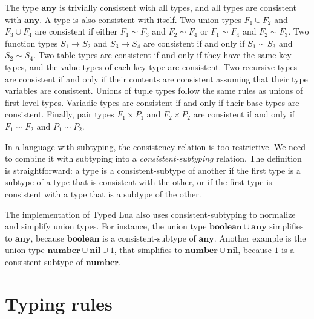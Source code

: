 \documentclass[10pt]{sigplanconf}
\newcommand{\Any}{\mathbf{any}}
\newcommand{\Nil}{\mathbf{nil}}
\newcommand{\Boolean}{\mathbf{boolean}}
\newcommand{\Number}{\mathbf{number}}
\begin{document}
The type $\Any$ is trivially consistent with all types, and all types
are consistent with $\Any$. A type is also consistent with
itself. Two union types $F_1 \cup F_2$ and $F_3 \cup F_4$ are
consistent if either $F_1 \sim F_3$ and $F_2 \sim F_4$ or
$F_1 \sim F_4$ and $F_2 \sim F_3$. Two function types
$S_1 \rightarrow S_2$ and $S_3 \rightarrow S_4$ are consistent
if and only if $S_1 \sim S_3$ and $S_2 \sim S_4$. Two table types are consistent if and only if they have the same key types, and the value types of each key type are consistent. Two recursive types are consistent if and only if their contents are consistent assuming that their type variables are consistent. Unions of tuple types follow the same rules as unions of first-level types. Variadic types are consistent if and only if their base types are consistent. 
Finally, pair types $F_1 \times P_1$ and $F_2 \times P_2$ are
consistent if and only if $F_1 \sim F_2$ and $P_1 \sim P_2$.

In a language with subtyping, the consistency relation is
too restrictive. We need to combine it with subtyping into a
{\em consistent-subtyping} relation. The definition is
straightforward: a type is a consistent-subtype
of another if the first type is a subtype of a type
that is consistent with the other, or if the first type
is consistent with a type that is a subtype of the other.

The implementation of Typed Lua also uses consistent-subtyping to normalize and simplify union types.
For instance, the union type $\Boolean \cup \Any$ simplifies
to $\Any$, because $\Boolean$ is a consistent-subtype
of $\Any$. Another example is the union type
$\Number \cup \Nil \cup 1$, that simplifies to
$\Number \cup \Nil$, because $1$ is a consistent-subtype of $\Number$.

\section{Typing rules}
\label{sec:rules}
\end{document}
